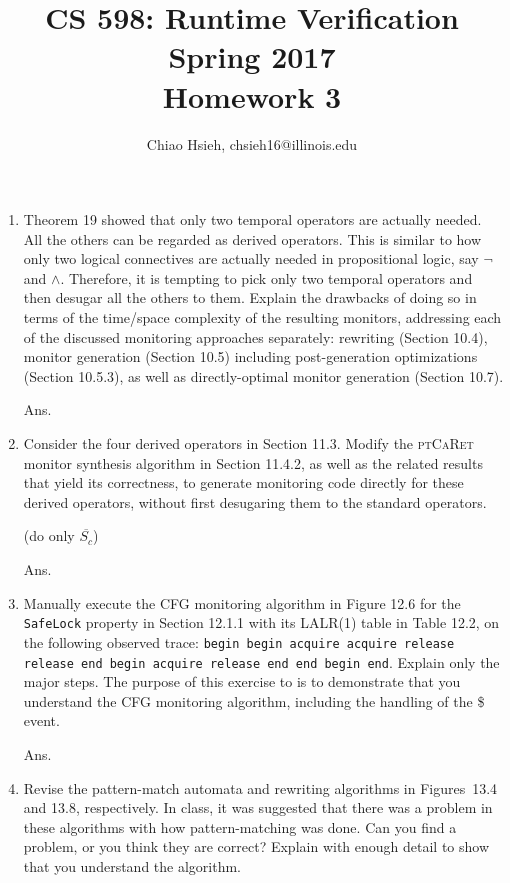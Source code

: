\documentclass{article}
\title{\Large\bfseries CS 598: Runtime Verification \\
Spring 2017 \\
Homework 3}
\author{Chiao Hsieh, chsieh16@illinois.edu}
\begin{document}
\maketitle

\begin{enumerate}
\item Theorem 19 showed that only two temporal operators are actually needed.
All the others can be regarded as derived operators.
This is similar to how only two logical connectives are actually needed in 
propositional logic, say $\neg$ and $\land$.
Therefore, it is tempting to pick only two temporal operators and then desugar
all the others to them.
Explain the drawbacks of doing so in terms of the time/space complexity of the
resulting monitors,
addressing each of the discussed monitoring approaches separately:
rewriting (Section 10.4), monitor generation (Section 10.5) including
post-generation optimizations (Section 10.5.3),
as well as directly-optimal monitor generation (Section 10.7).

Ans.


\item Consider the four derived operators in Section 11.3.
Modify the \textsc{ptCaRet} monitor synthesis algorithm in Section 11.4.2,
as well as the related results that yield its correctness,
to generate monitoring code directly for these derived operators,
without first desugaring them to the standard operators.

(do only $\overline{S_c}$)

Ans.


\item Manually execute the CFG monitoring algorithm in Figure 12.6 for the
\texttt{SafeLock} property in Section 12.1.1 with its LALR(1) table in Table 12.2,
on the following observed trace:
\texttt{begin begin acquire acquire release release end begin acquire release end
end begin end}.
Explain only the major steps.
The purpose of this exercise to is to demonstrate that you understand the CFG
monitoring algorithm, including the handling of the \$ event.

Ans.

\item Revise the pattern-match automata and rewriting algorithms in Figures~13.4
and 13.8, respectively.
In class, it was suggested that there was a problem in these algorithms with how
pattern-matching was done.
Can you find a problem, or you think they are correct?
Explain with enough detail to show that you understand the algorithm.


\end{enumerate}
\end{document}
